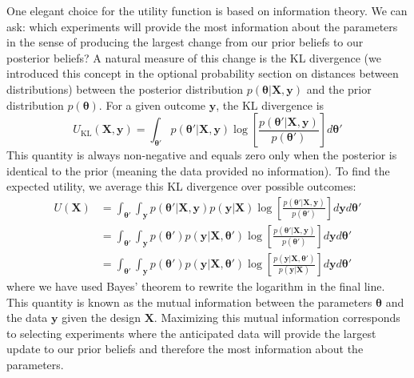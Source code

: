 One elegant choice for the utility function is based on information theory. We can ask: which experiments will provide the most information about the parameters in the sense of producing the largest change from our prior beliefs to our posterior beliefs? A natural measure of this change is the KL divergence (we introduced this concept in the optional probability section on distances between distributions) between the posterior distribution $p(\boldsymbol{\theta}|\mathbf{X}, \mathbf{y})$ and the prior distribution $p(\boldsymbol{\theta})$. For a given outcome $\mathbf{y}$, the KL divergence is
\begin{equation}
    U_{\text{KL}}(\mathbf{X}, \mathbf{y}) = \int_{\boldsymbol{\theta}'} p(\boldsymbol{\theta}'|\mathbf{X}, \mathbf{y}) \log\left[\frac{p(\boldsymbol{\theta}'|\mathbf{X}, \mathbf{y})}{p(\boldsymbol{\theta}')}\right] d\boldsymbol{\theta}'
\end{equation}
This quantity is always non-negative and equals zero only when the posterior is identical to the prior (meaning the data provided no information). To find the expected utility, we average this KL divergence over possible outcomes:
\begin{equation}
\begin{split}
    U(\mathbf{X}) &= \int_{\boldsymbol{\theta}'} \int_{\mathbf{y}} p(\boldsymbol{\theta}'|\mathbf{X}, \mathbf{y}) p(\mathbf{y}|\mathbf{X}) \log\left[\frac{p(\boldsymbol{\theta}'|\mathbf{X}, \mathbf{y})}{p(\boldsymbol{\theta}')}\right] d\mathbf{y} d\boldsymbol{\theta}' \\
    &= \int_{\boldsymbol{\theta}'} \int_{\mathbf{y}} p(\boldsymbol{\theta}') p(\mathbf{y}|\mathbf{X}, \boldsymbol{\theta}') \log\left[\frac{p(\boldsymbol{\theta}'|\mathbf{X}, \mathbf{y})}{p(\boldsymbol{\theta}')}\right] d\mathbf{y} d\boldsymbol{\theta}' \\
    &= \int_{\boldsymbol{\theta}'} \int_{\mathbf{y}} p(\boldsymbol{\theta}') p(\mathbf{y}|\mathbf{X}, \boldsymbol{\theta}') \log\left[\frac{p(\mathbf{y}|\mathbf{X}, \boldsymbol{\theta}')}{p(\mathbf{y}|\mathbf{X})}\right] d\mathbf{y} d\boldsymbol{\theta}'
\end{split}
\end{equation}
where we have used Bayes' theorem to rewrite the logarithm in the final line. This quantity is known as the mutual information between the parameters $\boldsymbol{\theta}$ and the data $\mathbf{y}$ given the design $\mathbf{X}$. Maximizing this mutual information corresponds to selecting experiments where the anticipated data will provide the largest update to our prior beliefs and therefore the most information about the parameters.

